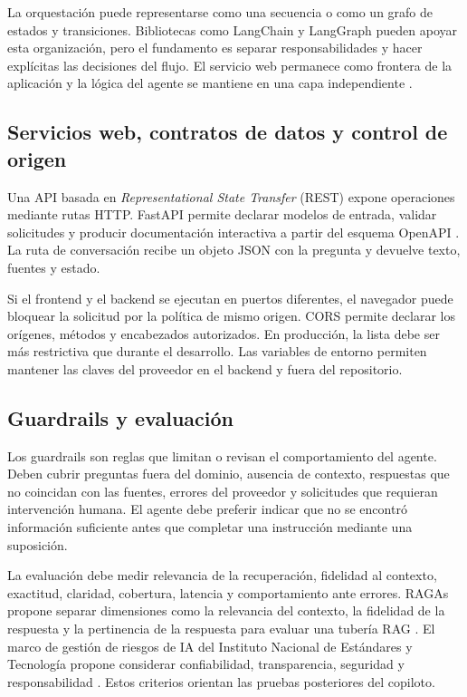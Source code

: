 La orquestación puede representarse como una secuencia o como un grafo de estados y transiciones. Bibliotecas como LangChain y LangGraph pueden apoyar esta organización, pero el fundamento es separar responsabilidades y hacer explícitas las decisiones del flujo. El servicio web permanece como frontera de la aplicación y la lógica del agente se mantiene en una capa independiente \cite{langchainDocs,langgraphDocs}.

\subsection{Servicios web, contratos de datos y control de origen}

Una API basada en \textit{Representational State Transfer} (REST) expone operaciones mediante rutas HTTP. FastAPI permite declarar modelos de entrada, validar solicitudes y producir documentación interactiva a partir del esquema OpenAPI \cite{fastapiDocs}. La ruta de conversación recibe un objeto JSON con la pregunta y devuelve texto, fuentes y estado.

Si el frontend y el backend se ejecutan en puertos diferentes, el navegador puede bloquear la solicitud por la política de mismo origen. CORS permite declarar los orígenes, métodos y encabezados autorizados. En producción, la lista debe ser más restrictiva que durante el desarrollo. Las variables de entorno permiten mantener las claves del proveedor en el backend y fuera del repositorio.

\subsection{Guardrails y evaluación}

Los guardrails son reglas que limitan o revisan el comportamiento del agente. Deben cubrir preguntas fuera del dominio, ausencia de contexto, respuestas que no coincidan con las fuentes, errores del proveedor y solicitudes que requieran intervención humana. El agente debe preferir indicar que no se encontró información suficiente antes que completar una instrucción mediante una suposición.

La evaluación debe medir relevancia de la recuperación, fidelidad al contexto, exactitud, claridad, cobertura, latencia y comportamiento ante errores. RAGAs propone separar dimensiones como la relevancia del contexto, la fidelidad de la respuesta y la pertinencia de la respuesta para evaluar una tubería RAG \cite{es2024ragas}. El marco de gestión de riesgos de IA del Instituto Nacional de Estándares y Tecnología propone considerar confiabilidad, transparencia, seguridad y responsabilidad \cite{nistAirmf}. Estos criterios orientan las pruebas posteriores del copiloto.
